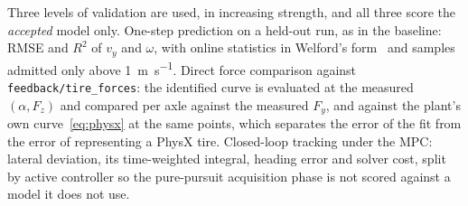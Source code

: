 Three levels of validation are used, in increasing strength, and all three score
the \emph{accepted} model only. One-step prediction on a held-out run,
as in the baseline: RMSE and $R^{2}$ of $v_{y}$ and $\omega$, with online
statistics in Welford's form~\cite{welford1962} and samples admitted only above
\SI{1}{\meter\per\second}. Direct force comparison against
\texttt{feedback/\allowbreak tire\_forces}: the identified curve is evaluated at
the measured $(\alpha,F_{z})$ and compared per axle against the measured
$F_{y}$, and against the plant's own curve~\eqref{eq:physx} at the same points,
which separates the error of the fit from the error of representing a PhysX
tire. Closed-loop tracking under the MPC: lateral deviation, its
time-weighted integral, heading error and solver cost, split by active
controller so the pure-pursuit acquisition phase is not scored against a model
it does not use.
